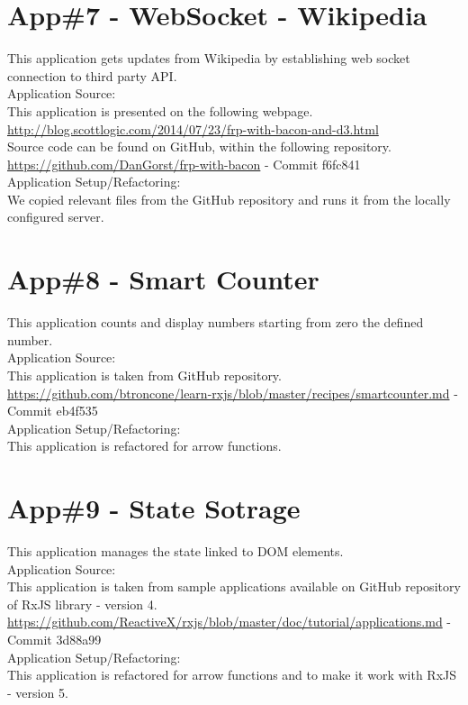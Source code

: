 \section{App\#7 - WebSocket - Wikipedia}
This application gets updates from Wikipedia by establishing web socket connection to third party API.\\
Application Source: \\
This application is presented on the following webpage.\\
\url{http://blog.scottlogic.com/2014/07/23/frp-with-bacon-and-d3.html}\\
Source code can be found on GitHub, within the following repository.\\
\url{https://github.com/DanGorst/frp-with-bacon} - Commit f6fc841\\
Application Setup/Refactoring: \\
We copied relevant files from the GitHub repository and runs it from the locally configured server.

\section{App\#8 - Smart Counter}
This application counts and display numbers starting from zero the defined number.\\
Application Source: \\
This application is taken from GitHub repository.\\
\url{https://github.com/btroncone/learn-rxjs/blob/master/recipes/smartcounter.md} - Commit eb4f535\\
Application Setup/Refactoring: \\
This application is refactored for arrow functions.

\section{App\#9 - State Sotrage}
This application manages the state linked to DOM elements.\\
Application Source: \\
This application is taken from sample applications available on GitHub repository of RxJS library - version 4.\\
\url{https://github.com/ReactiveX/rxjs/blob/master/doc/tutorial/applications.md} - Commit 3d88a99\\
Application Setup/Refactoring: \\
This application is refactored for arrow functions and to make it work with RxJS - version 5.


